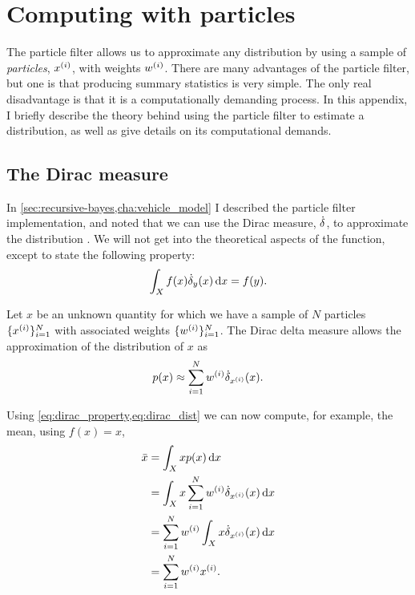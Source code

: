 \chapter{Computing with particles}
\label{app:computing-with-particles}

\phantom{\gps{}\gps{}\gps{}}

The particle filter allows us to approximate any distribution by using a sample of \emph{particles}, $x^{(i)}$, with weights $w^{(i)}$. There are many advantages of the particle filter, but one is that producing summary statistics is very simple. The only real disadvantage is that it is a computationally demanding process. In this appendix, I briefly describe the theory behind using the particle filter to estimate a distribution, as well as give details on its computational demands.


\section{The Dirac measure}
\label{app:dirac-delta-measure}

In \cref{sec:recursive-bayes,cha:vehicle_model} I described the particle filter implementation, and noted that we can use the Dirac measure, $\dot\delta$, to approximate the distribution \citep{Benedetto_1996}. We will not get into the theoretical aspects of the function, except to state the following property:
\begin{equation}
\label{eq:dirac_property}
\int_X f(x) \dot\delta_y(x)\,\mathrm{d}x = f(y).
\end{equation}

Let $x$ be an unknown quantity for which we have a sample of $N$ particles $\{x^{(i)}\}_{i=1}^N$ with associated weights $\{w^{(i)}\}_{i=1}^N$. The Dirac delta measure allows the approximation of the distribution of $x$ as
\begin{equation}
\label{eq:dirac_dist}
p(x) \approx \sum_{i=1}^N w^{(i)} \dot\delta_{x^{(i)}}(x).
\end{equation}


Using \cref{eq:dirac_property,eq:dirac_dist} we can now compute, for example, the mean, using $f(x) = x$,
\begin{equation}
\label{eq:dirac_mean}
\begin{split}
\bar x &= \int_X x p(x) \,\mathrm{d}x \\
&= \int_X x \sum_{i=1}^N w^{(i)} \dot\delta_{x^{(i)}}(x) \,\mathrm{d}x \\
&= \sum_{i=1}^N w^{(i)} \int_X x \dot\delta_{x^{(i)}}(x) \,\mathrm{d}x \\
&= \sum_{i=1}^N w^{(i)} x^{(i)}.
\end{split}
\end{equation}



